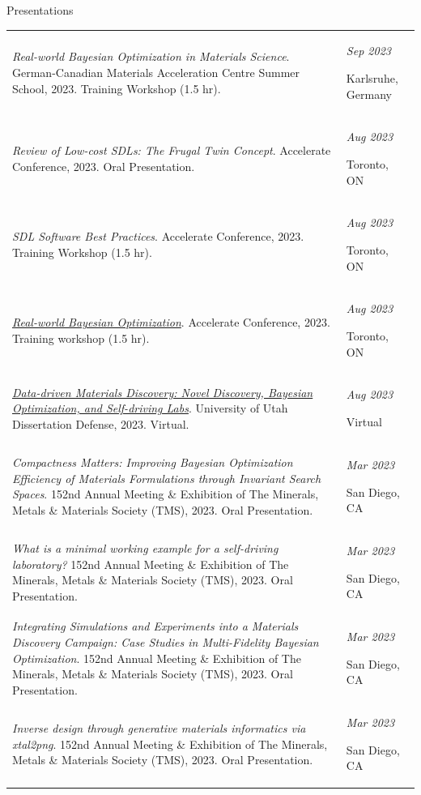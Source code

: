 \documentclass{resume} %
\begin{document}
\begin{rSection}{Presentations}
\begin{longtable}{m{13cm} m{3.5cm}}
{\textit{Real-world Bayesian Optimization in Materials Science}. German-Canadian Materials Acceleration Centre Summer School, 2023. Training Workshop (1.5 hr).} & {\em \hfill Sep 2023 \par \hfill Karlsruhe, Germany} \\
{\textit{Review of Low-cost SDLs: The Frugal Twin Concept}. Accelerate Conference, 2023. Oral Presentation.} & {\em \hfill Aug 2023 \par \hfill Toronto, ON} \\
{\textit{SDL Software Best Practices}. Accelerate Conference, 2023. Training Workshop (1.5 hr).} & {\em \hfill Aug 2023 \par \hfill Toronto, ON} \\
{\textit{\href{https://youtu.be/IVaWl2tL06c?si=SsoNCR_Ny3tuPvFX}{Real-world Bayesian Optimization}}. Accelerate Conference, 2023. Training workshop (1.5 hr).} & {\em \hfill Aug 2023 \par \hfill Toronto, ON} \\
{\textit{\href{https://youtu.be/LxIiWSfkhCE?si=9wVu4S7Ar8DhtuJ0&t=163}{Data-driven Materials Discovery: Novel Discovery, Bayesian Optimization, and Self-driving Labs}}. University of Utah Dissertation Defense, 2023. Virtual.} & {\em \hfill Aug 2023 \par \hfill Virtual} \\
{\textit{Compactness Matters: Improving Bayesian Optimization Efficiency of Materials Formulations through Invariant Search Spaces}. 152nd Annual Meeting \& Exhibition of The Minerals, Metals \& Materials Society (TMS), 2023. Oral Presentation.} & {\em \hfill Mar 2023 \par \hfill San Diego, CA} \\
{\textit{What is a minimal working example for a self-driving laboratory?} 152nd Annual Meeting \& Exhibition of The Minerals, Metals \& Materials Society (TMS), 2023. Oral Presentation.} & {\em \hfill Mar 2023 \par \hfill San Diego, CA} \\
{\textit{Integrating Simulations and Experiments into a Materials Discovery Campaign: Case Studies in Multi-Fidelity Bayesian Optimization}. 152nd Annual Meeting \& Exhibition of The Minerals, Metals \& Materials Society (TMS), 2023. Oral Presentation.} & {\em \hfill Mar 2023 \par \hfill San Diego, CA} \\
{\textit{Inverse design through generative materials informatics via xtal2png}. 152nd Annual Meeting \& Exhibition of The Minerals, Metals \& Materials Society (TMS), 2023. Oral Presentation.} & {\em \hfill Mar 2023 \par \hfill San Diego, CA} \\

\end{longtable}
\end{rSection}
\end{document}
